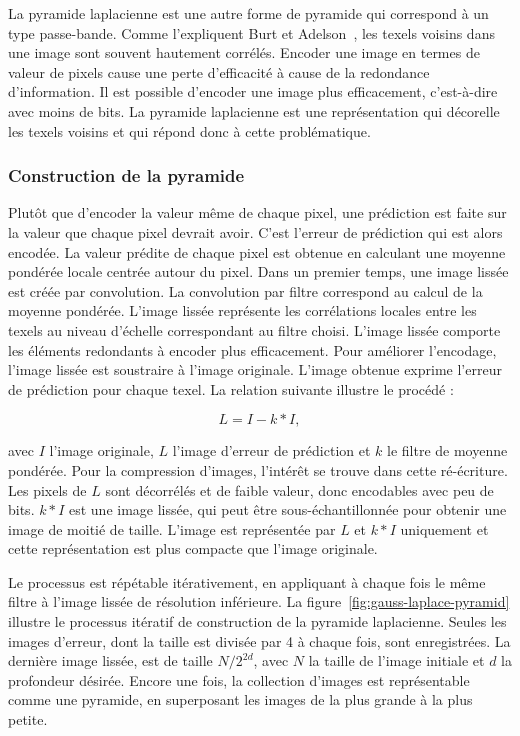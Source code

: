 La \og pyramide laplacienne \fg est une autre forme de pyramide qui correspond à un type passe-bande. Comme l'expliquent Burt et Adelson~\cite{burt_laplacian_1983}, les texels voisins dans une image sont souvent hautement corrélés. Encoder une image en termes de valeur de pixels cause une perte d'efficacité à cause de la redondance d'information. Il est possible d'encoder une image plus efficacement, c'est-à-dire avec moins de bits. La pyramide laplacienne est une représentation qui décorelle les texels voisins et qui répond donc à cette problématique.

\subsubsection{Construction de la pyramide}

Plutôt que d'encoder la valeur même de chaque pixel, une prédiction est faite sur la valeur que chaque pixel devrait avoir. C'est l'erreur de prédiction qui est alors encodée. La valeur prédite de chaque pixel est obtenue en calculant une moyenne pondérée locale centrée autour du pixel. Dans un premier temps, une image lissée est créée par convolution. La convolution par filtre correspond au calcul de la moyenne pondérée. L'image lissée représente les corrélations locales entre les texels au niveau d'échelle correspondant au filtre choisi. L'image lissée comporte les éléments redondants à encoder plus efficacement. Pour améliorer l'encodage, l'image lissée est soustraire à l'image originale. L'image obtenue exprime l'erreur de prédiction pour chaque texel. La relation suivante illustre le procédé :

\begin{equation}
    L = I - k * I,
\end{equation}

avec $I$ l'image originale, $L$ l'image d'erreur de prédiction et $k$ le filtre de moyenne pondérée. Pour la compression d'images, l'intérêt se trouve dans cette ré-écriture. Les pixels de $L$ sont décorrélés et de faible valeur, donc encodables avec peu de bits. $k*I$ est une image lissée, qui peut être sous-échantillonnée pour obtenir une image de moitié de taille. L'image est représentée par $L$ et $k*I$ uniquement et cette représentation est plus compacte que l'image originale.

\bigskip

Le processus est répétable itérativement, en appliquant à chaque fois le même filtre à l'image lissée de résolution inférieure. La figure~\ref{fig:gauss-laplace-pyramid} illustre le processus itératif de construction de la pyramide laplacienne. Seules les images d'erreur, dont la taille est divisée par 4 à chaque fois, sont enregistrées. La dernière image lissée, est de taille $N/2^{2d}$, avec $N$ la taille de l'image initiale et $d$ la profondeur désirée. Encore une fois, la collection d'images est représentable comme une pyramide, en superposant les images de la plus grande à la plus petite.


